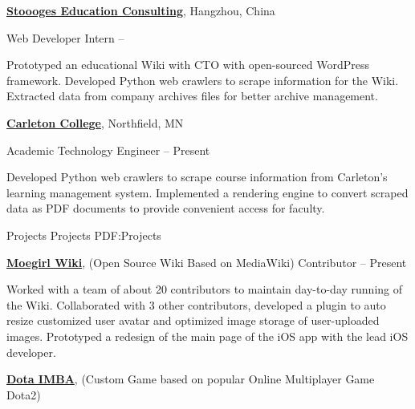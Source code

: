 \documentclass[letterpaper,MMMyyyy,nonstopmode]{simpleresumecv}
\begin{document}
\begin{Body}
\BigGap
\Entry
\href{http://stoooges.com/en/}
{\textbf{Stoooges Education Consulting}},
Hangzhou, China


\Gap
\BulletItem
Web Developer Intern
\hfill
{} --
\begin{Detail}
\SubBulletItem
Prototyped an educational Wiki with CTO with open-sourced WordPress framework.
\SubBulletItem
Developed Python web crawlers to scrape information for the Wiki.
\SubBulletItem
Extracted data from company archives files for better archive management.
\end{Detail}

\BigGap
\Entry
\href{http://stoooges.com/en/}
{\textbf{Carleton College}},
Northfield, MN

\Gap
\BulletItem
Academic Technology Engineer
\hfill
{} --
Present
\begin{Detail}
\SubBulletItem
Developed Python web crawlers to scrape course information from Carleton’s learning management system.
\SubBulletItem
Implemented a rendering engine to convert scraped data as PDF documents to provide convenient access for faculty.
\end{Detail}


\Section
{Projects}
{Projects}
{PDF:Projects}

\Entry
\href{https://moegirl.org/Mainpage}
{\textbf{Moegirl Wiki}},
\newline
(Open Source Wiki Based on MediaWiki)
\Gap
\BulletItem
Contributor
\hfill
{} --
Present
\begin{Detail}
\SubBulletItem
Worked with a team of about 20 contributors to maintain day-to-day running of the Wiki.
\SubBulletItem
Collaborated with 3 other contributors, developed a plugin to auto resize customized user avatar and optimized image storage of user-uploaded images.
\SubBulletItem
Prototyped a redesign of the main page of the iOS app with the lead iOS developer.
\end{Detail}

\BigGap
\Entry
\href{https://steamcommunity.com/sharedfiles/filedetails/?id=440115357}
{\textbf{Dota IMBA}},
\newline
(Custom Game based on popular Online Multiplayer Game Dota2)


\end{Body}
\end{document}
